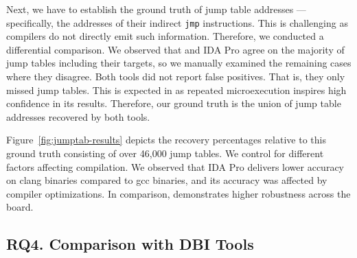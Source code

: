Next, we have to establish the ground truth of jump table addresses --- specifically, the addresses of their indirect \texttt{jmp} instructions.
This is challenging as compilers do not directly emit such information.
Therefore, we conducted a differential comparison.
We observed that {\bcov} and IDA Pro agree on the majority of jump tables including their targets, so we manually examined the remaining cases where they disagree.
Both tools did not report false positives.
That is, they only missed jump tables.
This is expected in {\bcov} as repeated microexecution inspires high confidence in its results.
Therefore, our ground truth is the union of jump table addresses recovered by both tools.

Figure~\ref{fig:jumptab-results} depicts the recovery percentages relative to this ground truth consisting of over 46,000 jump tables.
We control for different factors affecting compilation.
We observed that IDA Pro delivers lower accuracy on \textsf{clang} binaries compared to \textsf{gcc} binaries, and its accuracy was affected by compiler optimizations.
In comparison, {\bcov} demonstrates higher robustness across the board.



\subsection*{RQ4. Comparison with DBI Tools}




